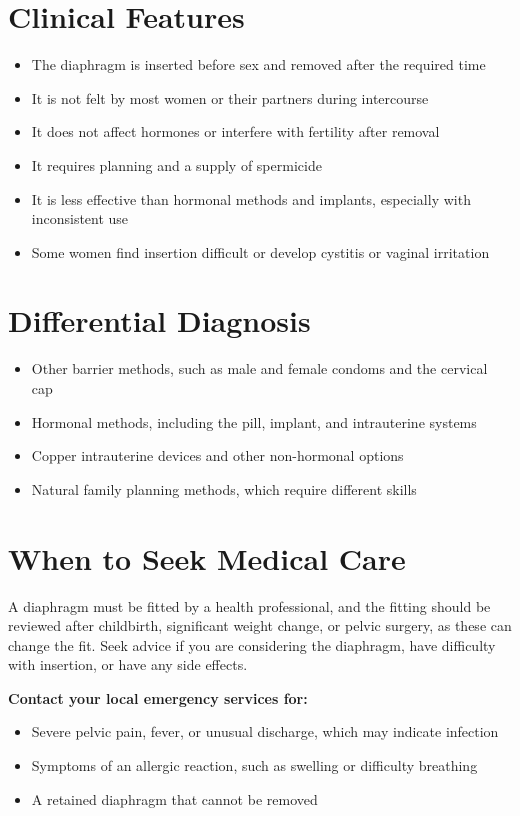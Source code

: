 \section*{Clinical Features}
\begin{itemize}
    \item The diaphragm is inserted before sex and removed after the required time
    \item It is not felt by most women or their partners during intercourse
    \item It does not affect hormones or interfere with fertility after removal
    \item It requires planning and a supply of spermicide
    \item It is less effective than hormonal methods and implants, especially with inconsistent use
    \item Some women find insertion difficult or develop cystitis or vaginal irritation
\end{itemize}

\section*{Differential Diagnosis}
\begin{itemize}
    \item Other barrier methods, such as male and female condoms and the cervical cap
    \item Hormonal methods, including the pill, implant, and intrauterine systems
    \item Copper intrauterine devices and other non-hormonal options
    \item Natural family planning methods, which require different skills
\end{itemize}

\section*{When to Seek Medical Care}
A diaphragm must be fitted by a health professional, and the fitting should be reviewed after childbirth, significant weight change, or pelvic surgery, as these can change the fit. Seek advice if you are considering the diaphragm, have difficulty with insertion, or have any side effects.

\textbf{Contact your local emergency services for:}
\begin{itemize}
    \item Severe pelvic pain, fever, or unusual discharge, which may indicate infection
    \item Symptoms of an allergic reaction, such as swelling or difficulty breathing
    \item A retained diaphragm that cannot be removed
\end{itemize}

